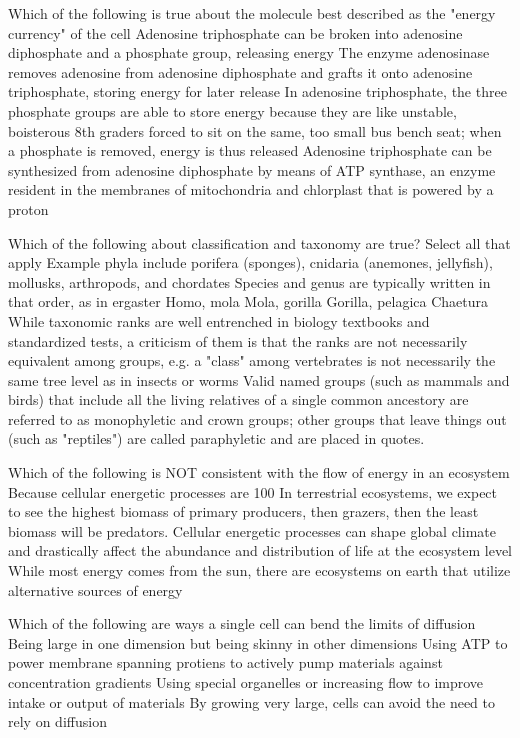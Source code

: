 Which of the following is true about the molecule best described as the "energy currency" of the cell
Adenosine triphosphate can be broken into adenosine diphosphate and a phosphate group, releasing energy
The enzyme adenosinase removes adenosine from adenosine diphosphate and grafts it onto adenosine triphosphate, storing energy for later release
In adenosine triphosphate, the three phosphate groups are able to store energy because they are like unstable, boisterous 8th graders forced to sit on the same, too small bus bench seat; when a phosphate is removed, energy is thus released
Adenosine triphosphate can be synthesized from adenosine diphosphate by means of ATP synthase, an enzyme resident in the membranes of mitochondria and chlorplast that is powered by a proton 




Which of the following about classification and taxonomy are true? Select all that apply
Example phyla include porifera (sponges), cnidaria (anemones, jellyfish), mollusks, arthropods, and chordates 
Species and genus are typically written in that order, as in ergaster Homo, mola Mola, gorilla Gorilla, pelagica Chaetura
While taxonomic ranks are well entrenched in biology textbooks and standardized tests, a criticism of them is that the ranks are not necessarily equivalent among groups, e.g. a "class" among vertebrates is not necessarily the same tree level as in insects or worms
Valid named groups (such as mammals and birds) that include all the living relatives of a single common ancestory are referred to as monophyletic and crown groups; other groups that leave things out (such as "reptiles") are called paraphyletic and are placed in quotes. 





Which of the following is NOT consistent with the flow of energy in an ecosystem
Because cellular energetic processes are 100%
In terrestrial ecosystems, we expect to see the highest biomass of primary producers, then grazers, then the least biomass will be predators. 
Cellular energetic processes can shape global climate and drastically affect the abundance and distribution of life at the ecosystem level
While most energy comes from the sun, there are ecosystems on earth that utilize alternative sources of energy




Which of the following are ways a single cell can bend the limits of diffusion
Being large in one dimension but being skinny in other dimensions
Using ATP to power membrane spanning protiens to actively pump materials against concentration gradients
Using special organelles or increasing flow to improve intake or output of materials
By growing very large, cells can avoid the need to rely on diffusion





